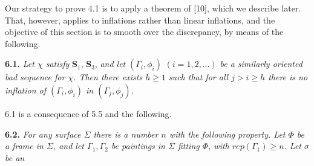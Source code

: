 
Our strategy to prove 4.1 is to apply a theorem of [10], which we describe later. That, however, applies to inflations rather than linear inflations, and the objective of this section is to smooth over the discrepancy, by means of the following.

\textbf{6.1.} \textit{Let $\chi$ satisfy} \textbf{S}$_1$, \textbf{S}$_3$, \textit{and let} $(\Gamma_i, \phi_i)$ $(i = 1, 2, \dots)$ \textit{be a similarly oriented bad sequence for $\chi$. Then there exists $h \ge 1$ such that for all $j > i \ge h$ there is no inflation of $(\Gamma_i, \phi_i)$ in $(\Gamma_j, \phi_j)$.}

6.1 is a consequence of 5.5 and the following.

\textbf{6.2.} \textit{For any surface $\Sigma$ there is a number $n$ with the following property. Let $\Phi$ be a frame in $\Sigma$, and let $\Gamma_1, \Gamma_2$ be paintings in $\Sigma$ fitting $\Phi$, with $rep(\Gamma_1) \ge n$. Let $\sigma$ be an}
